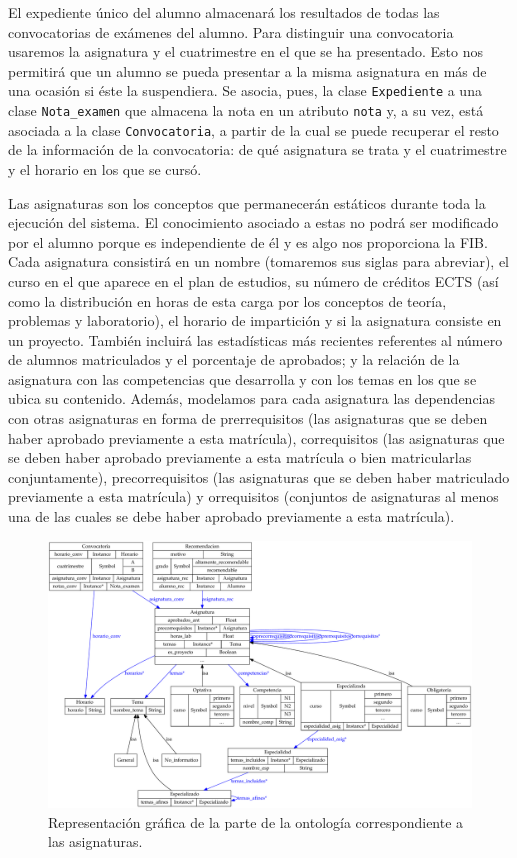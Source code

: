 El expediente único del alumno almacenará los resultados de todas las 
convocatorias de exámenes del alumno. Para distinguir una convocatoria 
usaremos la asignatura y el cuatrimestre en el que se ha presentado. Esto nos 
permitirá que un alumno se pueda presentar a la misma asignatura en más de una 
ocasión si éste la suspendiera. Se asocia, pues, la clase \texttt{Expediente} 
a una clase \texttt{Nota\_examen} que almacena la nota en un atributo 
\texttt{nota} y, a su vez, está asociada a la clase \texttt{Convocatoria}, 
a partir de la cual se puede recuperar el resto de la información de la 
convocatoria: de qué asignatura se trata y el cuatrimestre y el horario en los 
que se cursó. 

Las asignaturas son los conceptos que permanecerán estáticos durante toda
la ejecución del sistema. El conocimiento asociado a estas no podrá ser 
modificado por el alumno porque es independiente de él y es algo nos 
proporciona la FIB. Cada asignatura consistirá en un nombre (tomaremos sus 
siglas para abreviar), el curso en el que aparece en el plan de estudios, su 
número de créditos ECTS (así como la distribución en horas de esta carga por 
los conceptos de teoría, problemas y laboratorio), el horario de impartición y 
si la asignatura consiste en un proyecto. También incluirá las estadísticas 
más recientes referentes al número de alumnos matriculados y el porcentaje de 
aprobados; y la relación de la asignatura con las competencias que desarrolla 
y con los temas en los que se ubica su contenido. Además, modelamos para cada 
asignatura las dependencias con otras asignaturas en forma de prerrequisitos
(las asignaturas que se deben haber aprobado previamente a esta matrícula), 
correquisitos (las asignaturas que se deben haber aprobado previamente a esta 
matrícula o bien matricularlas conjuntamente), precorrequisitos (las 
asignaturas que se deben haber matriculado previamente a esta matrícula) 
y orrequisitos (conjuntos de asignaturas al menos una de las cuales se debe 
haber aprobado previamente a esta matrícula). 

\begin{figure}[ht]
    \centering
    \includegraphics[width=15cm]{ontologia-asignaturas}
    \caption{Representación gráfica de la parte de la ontología 
        correspondiente a las asignaturas.}
    \label{fig:ontologia-asignaturas}
\end{figure}

